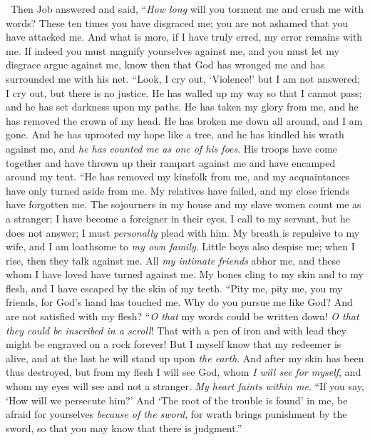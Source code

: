 \begin{biblechapter} %
  Then Job answered and said,
\verse “\textit{How long} will you torment me 
and crush me with words?
\verse These ten times you have disgraced me; 
you are not ashamed that you have attacked me.
\verse And what is more, if I have truly erred, 
my error remains with me.
\verse If indeed you must magnify yourselves against me, 
and you must let my disgrace argue against me,
\verse know then that God has wronged me 
and has surrounded me with his net.
\verse “Look, I cry out, ‘Violence!’ but I am not answered; 
I cry out, but there is no justice.
\verse He has walled up my way so that I cannot pass; 
and he has set darkness upon my paths.
\verse He has taken my glory from me, 
and he has removed the crown of my head.
\verse He has broken me down all around, and I am gone. 
And he has uprooted my hope like a tree,
\verse and he has kindled his wrath against me, 
and \textit{he has counted me as one of his foes}.
\verse His troops have come together 
and have thrown up their rampart against me 
and have encamped around my tent.
\verse “He has removed my kinsfolk from me, 
and my acquaintances have only turned aside from me.
\verse My relatives have failed, 
and my close friends have forgotten me.
\verse The sojourners in my house and my slave women count me as a stranger; 
I have become a foreigner in their eyes.
\verse I call to my servant, but he does not answer; 
I must \textit{personally} plead with him.
\verse My breath is repulsive to my wife, 
and I am loathsome to \textit{my own family}.
\verse Little boys also despise me; 
when I rise, then they talk against me.
\verse All \textit{my intimate friends} abhor me, 
and these whom I have loved have turned against me.
\verse My bones cling to my skin and to my flesh, 
and I have escaped by the skin of my teeth.
\verse “Pity me, pity me, you my friends, 
for God’s hand has touched me.
\verse Why do you pursue me like God? 
And are not satisfied with my flesh?
\verse “\textit{O that} my words could be written down! 
\textit{O that they could be inscribed in a scroll}!
\verse That with a pen of iron and with lead 
they might be engraved on a rock forever!
\verse But I myself know that my redeemer is alive, 
and at the last he will stand up upon \textit{the earth}.
\verse And after my skin has been thus destroyed, 
but from my flesh I will see God,
\verse whom \textit{I will see for myself}, 
and whom my eyes will see and not a stranger. 
\textit{My heart faints within me}.
\verse “If you say, ‘How will we persecute him?’ 
And ‘The root of the trouble is found’ in me,
\verse be afraid for yourselves \textit{because of the sword}, 
for wrath brings punishment by the sword, 
so that you may know that there is judgment.”
\end{biblechapter}

